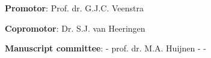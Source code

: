\newpage

{\parindent0pt
\textbf{Promotor}:\newline
Prof. dr. G.J.C. Veenstra
\vspace{0.5cm}

\textbf{Copromotor}:\newline
Dr. S.J. van Heeringen
\vspace{0.5cm}

\textbf{Manuscript committee}:\newline
- prof. dr. M.A. Huijnen
- \newline
- \newline
}
\newpage

\setcounter{tocdepth}{0}
\tableofcontents
